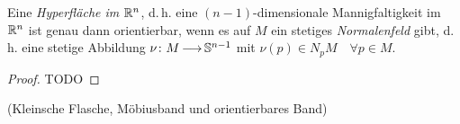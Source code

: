 \documentclass[skript.tex]{subfiles}
\begin{document}
	\begin{theorem}
		Eine \emph{Hyperfläche im ${\mathbb{R}^n}$}, d.\,h. eine $(n-1)$-dimensionale Mannigfaltigkeit im ${\mathbb{R}^n}$ ist genau dann orientierbar, wenn es auf $M$ ein stetiges \emph{Normalenfeld} gibt, d.\,h. eine stetige Abbildung $\nu \colon M \kern -1pt \longrightarrow \kern -1pt \mathbb{S}^{n-1}$ mit $\nu(p) \in N_p M \quad\forall p \in M$.
	\end{theorem}
	\begin{proof}
		TODO
	\end{proof}

	\begin{bsp}(Kleinsche Flasche, Möbiusband und orientierbares Band)\hfill
		\begin{center}
		\end{center}
	\end{bsp}
\end{document}
